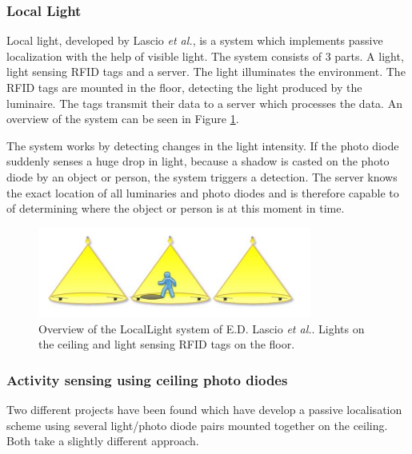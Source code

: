 \subsubsection{Local Light}
Local light, developed by Lascio \textit{et al.}\cite{LocaLight}, is a system which implements passive localization with the help of visible light. The system consists of 3 parts. A light, light sensing RFID tags and a server. The light illuminates the environment. The RFID tags are mounted in the floor, detecting the light produced by the luminaire. The tags transmit their data to a server which processes the data. An overview of the system can be seen in Figure \ref{fig:LocalLight}.

The system works by detecting changes in the light intensity. If the photo diode suddenly senses a huge drop in light, because a shadow is casted on the photo diode by an object or person, the system triggers a detection. The server knows the exact location of all luminaries and photo diodes and is therefore capable to of determining where the object or person is at this moment in time.

\begin{figure}[]
	\centering
	\includegraphics[width=90mm]{pics/LocalLight.png}
	\caption{Overview of the LocalLight system of E.D. Lascio \textit{et al.}\cite{LocaLight}. Lights on the ceiling and light sensing RFID tags on the floor.\label{fig:LocalLight}}
\end{figure}

\subsubsection{Activity sensing using ceiling photo diodes}
Two different projects have been found which have develop a passive localisation scheme using several light/photo diode pairs mounted together on the ceiling. Both take a slightly different approach.

